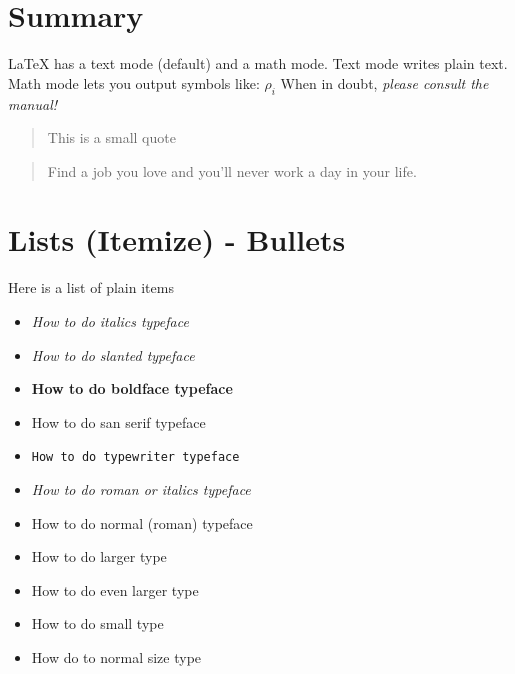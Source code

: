 \documentclass[11pt]{article}  %
\begin{document}
\maketitle  %

\begin{comment}
  This is a
  multi-line comment
  that will be ignored
\end{comment}

\section*{Summary}  %
LaTeX has a text mode (default) and a math mode.
Text mode writes plain text.  Math mode lets you output symbols like: $\rho_i$
When in doubt, \em please \em consult the manual!

\begin{quote}
This is a small quote
\end{quote}

\begin{quotation}
Find a job you love and you'll never work a day in your life.
\end{quotation}

\section*{Lists (Itemize) - Bullets}
Here is a list of plain items
\begin{itemize}  %
\item \it How to do italics typeface
\item \sl How to do slanted typeface
\item \bf How to do boldface typeface
\item \sf How to do san serif typeface
\item {\tt How to do typewriter typeface}  %
\item \em How to do roman or italics typeface
\item \rm How to do normal (roman) typeface  %
\item \large How to do larger type
\item \Large How to do even larger type
\item \small How to do small type
\item \normalsize How do to normal size type
\end{itemize}
\end{document}
